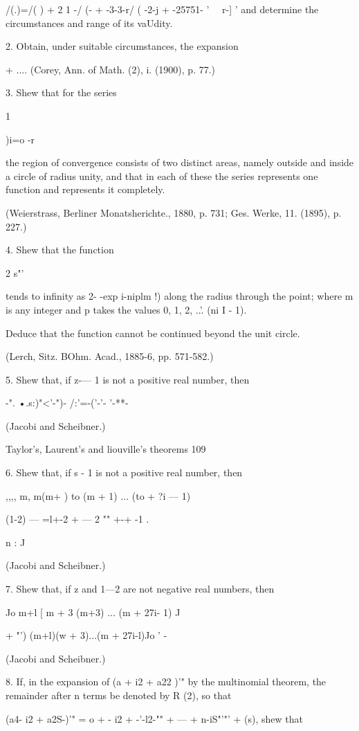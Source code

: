 {{{{/(.)=/( ) + 2 1 -/ (- + -3-3-r/ ( -2-j + -25751- ' \ \ r-] ' and
determine the circumstances and range of its vaUdity.

2. Obtain, under suitable circumstances, the expansion

+ .... (Corey, Ann. of Math. (2), i. (1900), p. 77.)

3. Shew that for the series

  1

)i=o -r~

the region of convergence consists of two distinct areas, namely
outside and inside a circle of radius unity, and that in each of these
the series represents one function and represents it completely.

(Weierstrass, Berliner Monatsherichte., 1880, p. 731; Ges. Werke, 11.
(1895), p. 227.)

4. Shew that the function

2 s"'

tends to infinity as 2- -exp i-niplm !) along the radius through the
point; where m is any integer and p takes the values 0, 1, 2, ..'.
(ni I - 1).

Deduce that the function cannot be continued beyond the unit circle.

(Lerch, Sitz. BOhm. Acad., 1885-6, pp. 571-582.)

5. Shew that, if z-— 1 is not a positive real number, then

-". •.s:)"<'-")- /:'=-('-'- '-**-

(Jacobi and Scheibner.)

Taylor's, Laurent's and liouville's theorems 109

6. Shew that, if s - 1 is not a positive real number, then

,,,, m, m(m+ ) to (m + 1) ... (to + ?i — 1)

(1-2) — =l+-2 + — 2 "" +-+ -1 .

n : J

(Jacobi and Scheibner.)

7. Shew that, if z and 1—2 are not negative real numbers, then

  Jo m+l [ m + 3 (m+3) ... (m + 27i- 1) J

+ "') (m+l)(w + 3)...(m + 27i-l)Jo ' -

(Jacobi and Scheibner.)

8. If, in the expansion of (a + i2 + a22 )'" by the multinomial
theorem, the remainder after n terms be denoted by R (2), so that

(a4- i2 + a2S-)'" = o + - i2 + -'-l2-"" + --- + n-iS"'"' + (s), shew
that

}}}}
